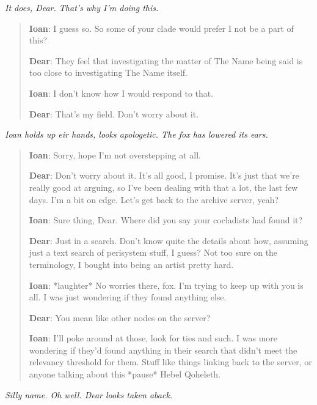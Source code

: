 \emph{It does, Dear. That's why I'm doing this.}

\begin{quote}
\textbf{Ioan}: I guess so. So some of your clade would prefer I not be a part of this?

\textbf{Dear}: They feel that investigating the matter of The Name being said is too close to investigating The Name itself.

\textbf{Ioan}: I don't know how I would respond to that.

\textbf{Dear}: That's my field. Don't worry about it.
\end{quote}

\emph{Ioan holds up eir hands, looks apologetic. The fox has lowered its ears.}

\begin{quote}
\textbf{Ioan}: Sorry, hope I'm not overstepping at all.

\textbf{Dear}: Don't worry about it. It's all good, I promise. It's just that we're really good at arguing, so I've been dealing with that a lot, the last few days. I'm a bit on edge. Let's get back to the archive server, yeah?

\textbf{Ioan}: Sure thing, Dear. Where did you say your cocladists had found it?

\textbf{Dear}: Just in a search. Don't know quite the details about how, assuming just a text search of perisystem stuff, I guess? Not too sure on the terminology, I bought into being an artist pretty hard.

\textbf{Ioan}: *laughter* No worries there, fox. I'm trying to keep up with you is all. I was just wondering if they found anything else.

\textbf{Dear}: You mean like other nodes on the server?

\textbf{Ioan}: I'll poke around at those, look for ties and such. I was more wondering if they'd found anything in their search that didn't meet the relevancy threshold for them. Stuff like things linking back to the server, or anyone talking about this *pause* Hebel Qoheleth.
\end{quote}

\emph{Silly name. Oh well. Dear looks taken aback.}


